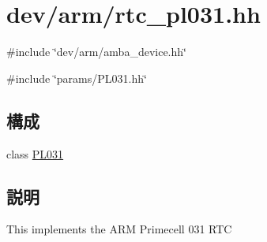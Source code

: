 \hypertarget{rtc__pl031_8hh}{
\section{dev/arm/rtc\_\-pl031.hh}
\label{rtc__pl031_8hh}
}
{\ttfamily \#include \char`\"{}dev/arm/amba\_\-device.hh\char`\"{}}\par
{\ttfamily \#include \char`\"{}params/PL031.hh\char`\"{}}\par
\subsection*{構成}
\begin{DoxyCompactItemize}
\item 
class \hyperlink{classPL031}{PL031}
\end{DoxyCompactItemize}


\subsection{説明}
This implements the ARM Primecell 031 RTC 